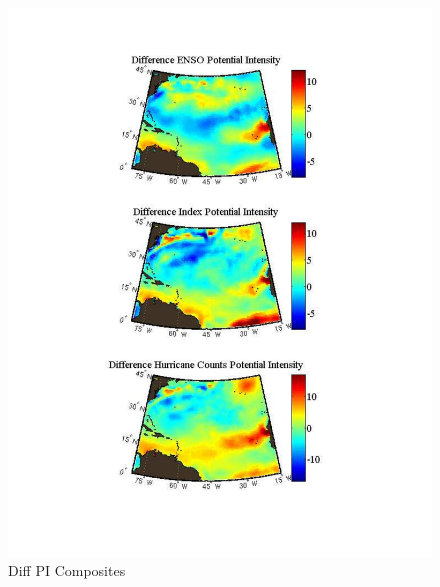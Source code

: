 \documentclass[]{article}
\begin{document}
\begin{figure}[ht]
\begin{minipage}[b]{0.55\linewidth}
\includegraphics[width=\textwidth]{figures/sensitivityResults/compositeMaps/diffPIAtlanticComposites.pdf}
\caption{Diff PI Composites}
\label{fig:figure22}
\end{minipage}
\end{figure}
\end{document}
